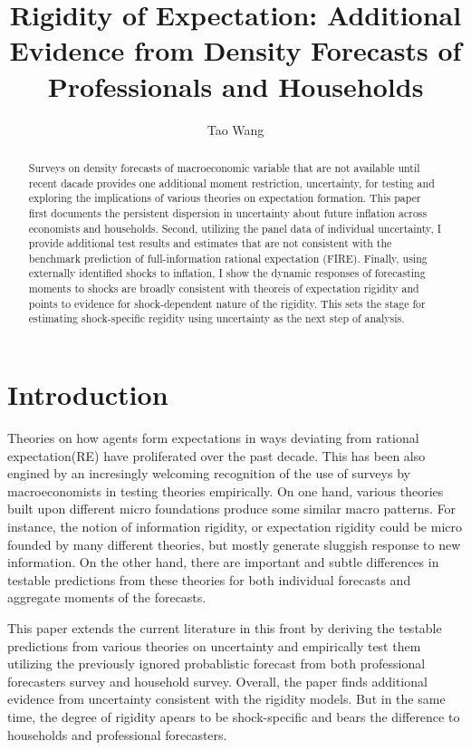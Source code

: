\documentclass[]{article}
\title{Rigidity of Expectation: Additional Evidence from Density Forecasts of Professionals and Households}
\author{Tao Wang}
\begin{document}
\maketitle

\begin{abstract}
	Surveys on density forecasts of macroeconomic variable that are not available until recent dacade provides one additional moment restriction, uncertainty, for testing and exploring the implications of various theories on expectation formation. This paper first documents the persistent dispersion in uncertainty about future inflation across economists and households. Second,  utilizing the panel data of individual uncertainty, I provide additional test results and estimates that are not consistent with the benchmark prediction of full-information rational expectation (FIRE). Finally, using externally identified shocks to inflation, I show the dynamic responses of forecasting moments to shocks are broadly consistent with theoreis of expectation rigidity and points to evidence for shock-dependent nature of the rigidity.  This sets the stage for estimating shock-specific regidity using uncertainty as the next step of analysis.  
	
\end{abstract}

\newpage 

\section{Introduction}


Theories on how agents form expectations in ways deviating from rational expectation(RE) have proliferated over the past decade. This has been also engined by an incresingly welcoming recognition of the use of surveys by macroeconomists in testing theories empirically.  On one hand, various theories built upon different micro foundations produce some similar macro patterns. For instance, the notion of information rigidity, or expectation rigidity could be micro founded by many different theories, but mostly generate sluggish response to new information.  On the other hand, there are important and subtle differences in testable predictions from these theories for both individual forecasts and aggregate moments of the forecasts. 

This paper extends the current literature in this front by deriving the testable predictions from various theories on uncertainty and empirically test them utilizing the previously ignored probablistic forecast from both professional forecasters survey and household survey. Overall, the paper finds additional evidence from uncertainty consistent with the rigidity models. But in the same time, the degree of rigidity apears to be shock-specific and bears the difference to households and professional forecasters. 
\end{document}
